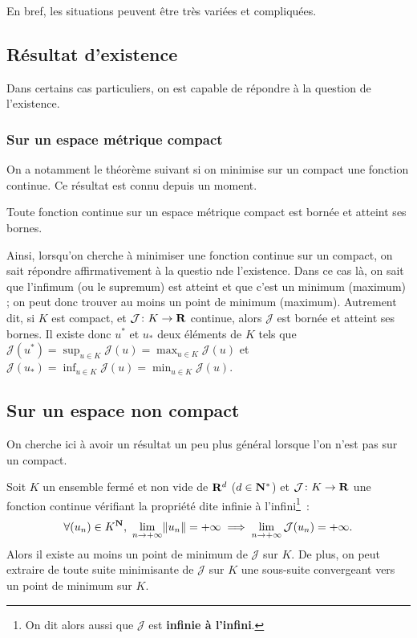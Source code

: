 \documentclass[grape]{../ceri/sty/MasterNotes}
\newcommand\J{\mathcal J}
\begin{document}
En bref, les situations peuvent être très variées et compliquées.

\subsection{Résultat d'existence}

Dans certains cas particuliers, on est capable de répondre à la question de l'existence.

\subsubsection{Sur un espace métrique compact}

On a notamment le théorème suivant si on minimise sur un compact une fonction continue. Ce résultat est connu depuis un moment.

\begin{theo}\label{th:1.4.1}
    Toute fonction continue sur un espace métrique compact est bornée et atteint ses bornes.
\end{theo}

Ainsi, lorsqu'on cherche à minimiser une fonction continue sur un compact, on sait répondre affirmativement à la questio nde l'existence. Dans ce cas là, on sait que l'infimum (ou le supremum) est atteint et que c'est un minimum (maximum) ; on peut donc trouver au moins un point de minimum (maximum). Autrement dit, si $K$ est compact, et $\J\colon K\to\R$ continue, alors $\J$ est bornée et atteint ses bornes. Il existe donc $u^*$ et $u_*$ deux éléments de $K$ tels que $\J(u^*)=\displaystyle\sup_{u\in K}\J(u)=\max_{u\in K}\J(u)$ et $\J(u_*)=\displaystyle\inf_{u\in K}\J(u)=\min_{u\in K}\J(u)$.

\subsection{Sur un espace non compact}

On cherche ici à avoir un résultat un peu plus général lorsque l'on n'est pas sur un compact.

\begin{theo}\label{th:1.4.2}
    Soit $K$ un ensemble fermé et non vide de $\mathbf{R}^d$ ($d\in\mathbf{N}^*$) et $\J\colon K\to\R$ une fonction continue vérifiant la propriété dite \og infinie à l'infini\footnote{On dit alors aussi que $\J$ est \textbf{infinie à l'infini}.}\fg\ :
    \[ \forall (u_n)\in K^\N,\ \lim_{n\to+\infty}\norme{u_n}=+\infty\implies\lim_{n\to+\infty}\J(u_n) = +\infty. \]
    Alors il existe au moins un point de minimum de $\J$ sur $K$. De plus, on peut extraire de toute suite minimisante de $\J$ sur $K$ une sous-suite convergeant vers un point de minimum sur $K$.
\end{theo}
\end{document}
